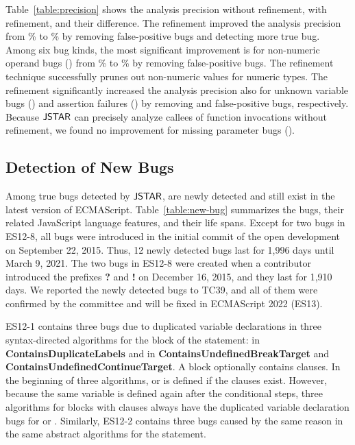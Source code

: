 Table~\ref{table:precision} shows the analysis precision without refinement,
with refinement, and their difference.  The refinement improved the analysis
precision from \% to \% by removing 
false-positive bugs and detecting  more true bug.  Among six
bug kinds, the most significant improvement is for non-numeric
operand bugs () from \% to \%
by removing  false-positive bugs.  The refinement technique
successfully prunes out non-numeric values for numeric types.
The refinement significantly increased the analysis precision also for unknown
variable bugs () and assertion failures
() by removing  and  false-positive bugs, respectively.
Because $\tool$ can precisely analyze callees of function invocations
without refinement, we found no improvement for missing
parameter bugs ().


\subsection{Detection of New Bugs}\label{sec:new-bug}

Among  true bugs detected by $\tool$,  are newly
detected and still exist in the latest version of ECMAScript.
Table~\ref{table:new-bug} summarizes the bugs, their
related JavaScript language features, and their life spans.
Except for two bugs in ES12-8, all bugs were introduced in the initial
commit of the open development on September 22, 2015.
Thus, 12 newly detected bugs last for 1,996 days until March 9, 2021.
The two bugs in ES12-8 were created when a contributor introduced
the prefixes \textbf{?} and \textbf{!} on December 16, 2015, and they last for 1,910 days.
We reported the newly detected bugs to TC39, and all of them were
confirmed by the committee and will be fixed in ECMAScript 2022 (ES13).

ES12-1 contains three bugs due to duplicated variable declarations
in three syntax-directed algorithms for the  block
of the  statement:
 in \textbf{ContainsDuplicateLabels} and
 in \textbf{ContainsUndefinedBreakTarget} and
\textbf{ContainsUndefinedContinueTarget}.
A  block optionally contains  clauses.
In the beginning of three algorithms,
 or  is defined if the clauses exist.
However, because the same variable is defined again after the conditional steps,
three algorithms for  blocks
with  clauses always have the duplicated variable declaration bugs for
 or .
Similarly, ES12-2 contains three bugs caused by the same reason in the
same abstract algorithms for the  statement.

